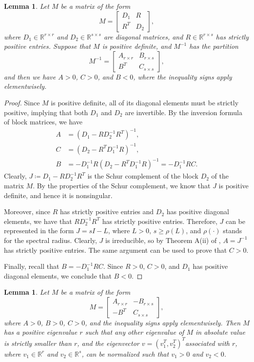 \documentclass{article}
\theoremstyle{plain}
\newtheorem{lemma}[theorem]{Lemma}
\theoremstyle{definition}
\theoremstyle{remark}
\begin{document}
\begin{lemma} \label{lem:M-inv-block-sign}
Let $M$ be a matrix of the form
\[
M=\begin{bmatrix}D_{1} & R\\
R^{T} & D_{2}
\end{bmatrix},
\]
where $D_{1}\in\mathbb{R}^{r\times r}$ and $D_{2}\in\mathbb{R}^{s\times s}$
are diagonal matrices, and $R\in\mathbb{R}^{r\times s}$ has strictly
positive entries. Suppose that $M$ is positive definite, and $M^{-1}$
has the partition
\[
M^{-1}=\begin{bmatrix}A_{r\times r} & B_{r\times s}\\
B^{T} & C_{s\times s}
\end{bmatrix},
\]
and then we have $A>0$, $C>0$, and $B<0$, where the inequality
signs apply elementwisely.
\end{lemma}

\begin{proof}
Since $M$ is positive definite, all of its diagonal elements must
be strictly positive, implying that both $D_{1}$ and $D_{2}$ are
invertible. By the inversion formula of block matrices, we have
\begin{align*}
A & =(D_{1}-RD_{2}^{-1}R^{T})^{-1},\\
C & =(D_{2}-R^{T}D_{1}^{-1}R)^{-1},\\
B & =-D_{1}^{-1}R(D_{2}-R^{T}D_{1}^{-1}R)^{-1}=-D_{1}^{-1}RC.
\end{align*}
Clearly, $J\coloneqq D_{1}-RD_{2}^{-1}R^{T}$ is the Schur complement
of the block $D_{2}$ of the matrix $M$. By the properties of the
Schur complement, we know that $J$ is positive definite, and hence
it is nonsingular.

Moreover, since $R$ has strictly positive entries and $D_{2}$ has
positive diagonal elements, we have that $RD_{2}^{-1}R^{T}$ has strictly
positive entries. Therefore, $J$ can be represented in the form $J=sI-L$,
where $L>0$, $s\ge\rho(L)$, and $\rho(\cdot)$ stands for the spectral
radius. Clearly, $J$ is irreducible, so by Theorem A(ii) of \citet{meyer1978singular},
$A=J^{-1}$ has strictly positive entries. The same argument can be
used to prove that $C>0$.

Finally, recall that $B=-D_{1}^{-1}RC$. Since $R>0$, $C>0$, and
$D_{1}$ has positive diagonal elements, we conclude that $B<0$.

\end{proof}

\begin{lemma} \label{lem:M-eigenvector-sign}
Let $M$ be a matrix of the form
\[
M=\begin{bmatrix}A_{r\times r} & -B_{r\times s}\\
-B^{T} & C_{s\times s}
\end{bmatrix},
\]
where $A>0$, $B>0$, $C>0$, and the inequality signs apply elementwisely.
Then $M$ has a positive eigenvalue $r$ such that any other eigenvalue
of $M$ in absolute value is strictly smaller than $r$, and the eigenvector
$v=(v_{1}^{T},v_{2}^{T})^{T}$associated with $r$, where $v_{1}\in\mathbb{R}^{r}$
and $v_{2}\in\mathbb{R}^{s}$, can be normalized such that $v_{1}>0$
and $v_{2}<0$.
\end{lemma}
\end{document}
